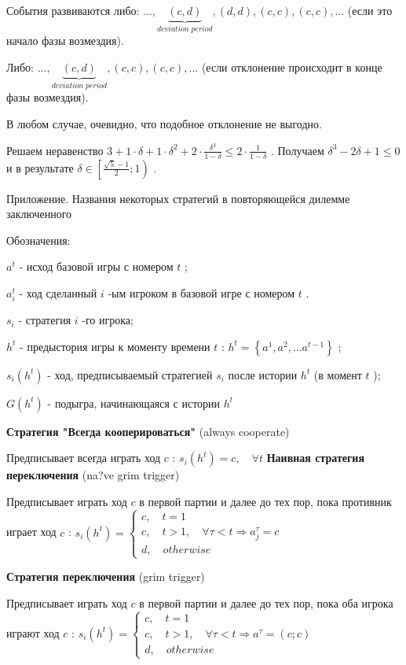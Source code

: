 \documentclass[pdftex,12pt,a4paper]{article}
\begin{document}
События развиваются либо:  $...,\underbrace{\left(c,d\right)}_{deviation\; period},\left(d,d\right),\left(c,c\right),\left(c,c\right),...$  (если это начало фазы возмездия).

Либо:  $...,\underbrace{\left(c,d\right)}_{deviation\; period},\left(c,c\right),\left(c,c\right),...$  (если отклонение происходит в конце фазы возмездия).

В любом случае, очевидно, что подобное отклонение не выгодно.

Решаем неравенство  $3+1\cdot \delta +1\cdot \delta ^{2} +2\cdot \frac{\delta ^{3} }{1-\delta } \le 2\cdot \frac{1}{1-\delta } $ . Получаем  $\delta ^{3} -2\delta +1\le 0$  и в результате  $\delta \in \left[\frac{\sqrt{5} -1}{2} ;1\right)$ .

{\bf }Приложение. Названия некоторых стратегий в повторяющейся дилемме заключенного

Обозначения:

 $a^{t} $  - исход базовой игры с номером  $t$ ;

 $a_{i}^{t} $  - ход сделанный  $i$ -ым игроком в базовой игре с номером  $t$ .

 $s_{i} $  - стратегия  $i$ -го игрока;

 $h^{t} $  - предыстория игры к моменту времени  $t$ :  $h^{t} =\left\{a^{1} ,a^{2} ,...a^{t-1} \right\}$ ;

 $s_{i} \left(h^{t} \right)$  - ход, предписываемый стратегией  $s_{i} $  после истории  $h^{t} $  (в момент  $t$ );

 $G\left(h^{t} \right)$  - подыгра, начинающаяся с истории  $h^{t} $

\textbf{ Стратегия "Всегда кооперироваться"} (always cooperate)

Предписывает всегда играть ход  $c$ :  $s_{i} \left(h^{t}
\right)=c,\quad \forall t$ \textbf{Наивная стратегия переключения}
(na?ve grim trigger)

Предписывает играть ход  $c$  в первой партии и далее до тех пор, пока противник играет ход  $c$ :  $s_{i} \left(h^{t} \right)=\left\{\begin{array}{l} {c,\quad t=1} \\ {c,\quad t>1,\quad \forall \tau <t\Rightarrow a_{j}^{\tau } =c} \\ {d,\quad otherwise} \end{array}\right. $

{\bf Стратегия переключения} (grim trigger)

Предписывает играть ход  $c$  в первой партии и далее до тех пор, пока оба игрока играют ход  $c$ :  $s_{i} \left(h^{t} \right)=\left\{\begin{array}{l} {c,\quad t=1} \\ {c,\quad t>1,\quad \forall \tau <t\Rightarrow a^{\tau } =\left(c;c\right)} \\ {d,\quad otherwise} \end{array}\right. $
\end{document}
